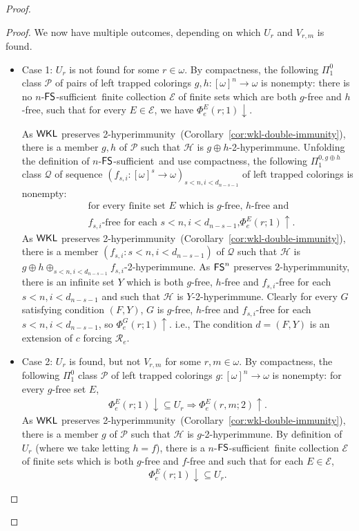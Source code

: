 \documentclass{amsart}
\theoremstyle{definition}
\theoremstyle{remark}
\numberwithin{equation}{section}
\theoremstyle{noparens}
\def\propertyL{2-hyperimmunity}
\def\hyper{2-hyperimmune}
\def\mcal{\mathcal}
\newcommand{\Hcal}{\mathcal{H}}
\newcommand{\Pcal}{\mathcal{P}}
\newcommand{\s}[1]{\ensuremath{\sf{#1}}}
\DeclareMathOperator{\wkl}{\s{WKL}}
\DeclareMathOperator{\fs}{\s{FS}}
\def\fssufficient{$\fs$-sufficient}
\begin{document}
\begin{proof}
\begin{proof}
We now have multiple outcomes, depending on which $U_r$ and $V_{r,m}$ is found.
\begin{itemize}
	\item Case 1: $U_r$ is not found for some $r \in \omega$. By compactness, the
following $\Pi^{0}_1$ class
	$\Pcal$ of pairs of left trapped colorings $g, h : [\omega]^n \to \omega$
is nonempty:
	there is no   $n$-\fssufficient\ finite collection
$\mcal{E}$ of finite sets which are both $g$-free and $h$-free,
	 such that for every $E\in\mcal{E}$, we have
	$\Phi_e^{E}(r;1) \downarrow$.

	As $\wkl$ preserves \propertyL\
	(Corollary~\ref{cor:wkl-double-immunity}), there is a member $g, h $
of $\Pcal$ such that
	$\Hcal$ is $g \oplus h$-\hyper.
Unfolding the definition of $n$-\fssufficient\ and use compactness,
the following  $\Pi_1^{0,g\oplus h}$ class $\mcal{Q}$
of sequence $(f_{s,i}:[\omega]^s\rightarrow\omega)_{s<n,i<d_{n-s-1}}$ of left trapped colorings
is nonempty:
\begin{align}\label{fstseq10}
&\text{for every finite set $E$ which is $g$-free, $h$-free and }\\ \nonumber
&\text{$f_{s,i}$-free for each $s< n,i<d_{n-s-1}$,
$\Phi_e^{E}(r;1) \uparrow$.}
\end{align}
 As $\wkl$ preserves \propertyL\
	(Corollary~\ref{cor:wkl-double-immunity}),
there is a member $(f_{s,i}:s< n,i<d_{n-s-1})$ of $\mcal{Q}$
such that $\Hcal$ is $g\oplus h\oplus_{s< n,i<d_{n-s-1}}f_{s,i}$-\hyper.
	As $\fs^n$ preserves \propertyL, there is an infinite set $Y $ which is both
	$g$-free, $h$-free and $f_{s,i}$-free for each $s< n,i<d_{n-s-1}$ and such that $\Hcal$ is $Y $-\hyper.
	Clearly for every $G$ satisfying condition $(F,Y)$,
$G$ is $g$-free, $h$-free and $f_{s,i}$-free for each $s< n,i<d_{n-s-1}$,
so 	$\Phi_e^{  G}(r;1) \uparrow$.
i.e.,
	The condition $d = (F, Y)$ is an extension of $c$ forcing $\mcal{R}_e$.
	\bigskip

	\item Case 2: $U_r$ is found, but not $V_{r,m}$ for some $r, m \in \omega$. By compactness,
	the following $\Pi^{0}_1$ class $\Pcal$ of  left trapped colorings $g : [\omega]^n \to \omega$
is nonempty:
	 for every $g$-free set $E $,
	\begin{align}\label{fsts-fsnstongpreserve-defofg}
	 \Phi_e^{E}(r;1) \downarrow \subseteq U_r\Rightarrow
		 \Phi_e^{E}(r, m;2) \uparrow.
	\end{align}
  As $\wkl$ preserves \propertyL\
	(Corollary~\ref{cor:wkl-double-immunity}), there is a member $g$
of $\Pcal$ such that $\Hcal$ is $g  $-\hyper.
	By definition of $U_r$ (where we take letting $h = f$),
	there is a $n$-\fssufficient\ finite collection $\mcal{E}$
of finite sets
	which is both $g$-free and $f$-free and such that for each $E\in\mcal{E}$,
	$$
	\Phi_e^{E}(r;1) \downarrow \subseteq U_r.
	$$


\end{itemize}
\end{proof}
\end{proof}
\end{document}
